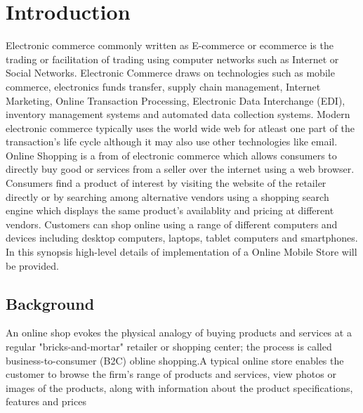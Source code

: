 \documentclass[hidelinks,a4paper,12pt]{article}
\begin{document}
\newpage
	
\tableofcontents
	
\setcounter{tocdepth}{3}
	
	
\newpage

\clearpage

\pagestyle{plain}
\setcounter{page}{1}


\section{Introduction}
Electronic commerce commonly written as E-commerce or ecommerce is the trading or facilitation of trading using computer networks such as Internet or Social Networks. Electronic Commerce draws on technologies such as mobile commerce, electronics funds transfer, supply chain management, Internet Marketing, Online Transaction Processing, Electronic Data Interchange (EDI), inventory management systems and automated data collection systems. Modern electronic commerce typically uses the world wide web for atleast one part of the transaction's life cycle although it may also use other technologies like email.
\\

Online Shopping is a from of electronic commerce which allows consumers to directly buy good or services from a seller over the internet using a web browser. Consumers find a product of interest by visiting the website of the retailer directly or by searching among alternative vendors using a shopping search engine which displays the same product's availablity and pricing at different vendors. Customers can shop online using a range of different computers and devices including desktop computers, laptops, tablet computers and smartphones.
\\

In this synopsis high-level details of implementation of a Online Mobile Store will be provided.
\bigskip

\newpage


\subsection{Background}
An online shop evokes the physical analogy of buying products and services at a regular "bricks-and-mortar" retailer or shopping center; the process is called business-to-consumer (B2C) obline shopping.A typical online store enables the customer to browse the firm's range of products and services, view photos or images of the products, along with information about the product specifications, features and prices
\\
\end{document}
